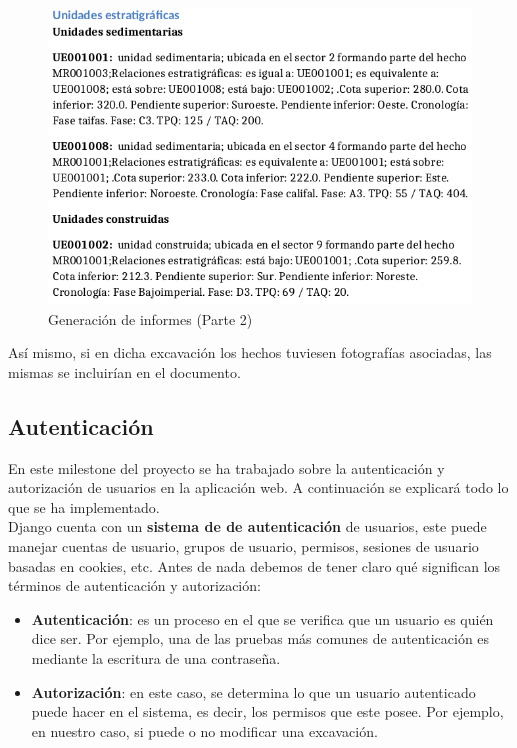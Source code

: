     \begin{figure}[H]
        \centering
        \includegraphics[scale=0.55]{imagenes/report-generator2.png}
        \caption{Generación de informes (Parte 2)}
        \label{fig:report-generator2}
    \end{figure}

Así mismo, si en dicha excavación los hechos tuviesen fotografías asociadas, las mismas
se incluirían en el documento.

\subsection{Autenticación}
En este milestone del proyecto se ha trabajado sobre la autenticación y autorización de
usuarios en la aplicación web. A continuación se explicará todo lo que se ha
implementado.\\

Django cuenta con un \textbf{sistema de de autenticación} \cite{django-auth} de usuarios,
este puede manejar cuentas de usuario, grupos de usuario, permisos, sesiones de usuario
basadas en cookies, etc. Antes de nada debemos de tener claro qué significan los términos
de autenticación y autorización:

    \begin{itemize}
        \item \textbf{Autenticación}: es un proceso en el que se verifica que un usuario
        es quién dice ser. Por ejemplo, una de las pruebas más comunes de autenticación
        es mediante la escritura de una contraseña.
        \item \textbf{Autorización}: en este caso, se determina lo que un usuario
        autenticado puede hacer en el sistema, es decir, los permisos que este posee. Por
        ejemplo, en nuestro caso, si puede o no modificar una excavación.
    \end{itemize}

